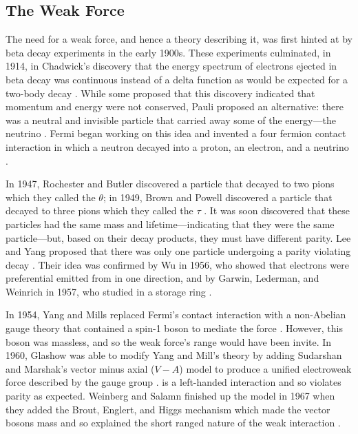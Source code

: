 \subsection{The Weak Force}
\label{subsection:weak_force}

The need for a weak force, and hence a theory describing it, was first hinted
at by beta decay experiments in the early 1900s. These experiments culminated,
in 1914, in Chadwick's discovery that the energy spectrum of electrons ejected
in beta decay was continuous instead of a delta function as would be expected
for a two-body decay \cite{chadwick1914}. While some proposed that this
discovery indicated that momentum and energy were not conserved, Pauli proposed
an alternative: there was a neutral and invisible particle that carried away
some of the energy---the neutrino \cite{pauli1930}. Fermi began working on this
idea and invented a four fermion contact interaction in which a neutron decayed
into a proton, an electron, and a neutrino \cite{fermi1934}.

In 1947, Rochester and Butler discovered a particle that decayed to two pions
which they called the $\theta$; in 1949, Brown and Powell discovered a particle
that decayed to three pions which they called the $\tau$
\cite{Rochester1947}\cite{brown1949}. It was soon discovered that these
particles had the same mass and lifetime---indicating that they were the same
particle---but, based on their decay products, they must have different parity.
Lee and Yang proposed that there was only one particle undergoing a parity
violating decay \cite{lee1956}. Their idea was confirmed by Wu in 1956, who
showed that electrons were preferential emitted from \cobaltsixty in one
direction, and by Garwin, Lederman, and Weinrich in 1957, who studied \pitomunu
in a storage ring \cite{wu1956}\cite{garwin1957}.

In 1954, Yang and Mills replaced Fermi's contact interaction with a non-Abelian
gauge theory that contained a spin-1 boson to mediate the force
\cite{yang1954}. However, this boson was massless, and so the weak force's
range would have been invite. In 1960, Glashow was able to modify Yang and
Mill's theory by adding Sudarshan and Marshak's vector minus axial ($V-A$)
model to produce a unified electroweak force described by the \SUtwoUone gauge
group \cite{glashow1961}\cite{sudarshan1958}. \SUtwo is a left-handed
interaction and so violates parity as expected. Weinberg and Salamn finished up
the model in 1967 when they added the Brout, Englert, and Higgs mechanism which
made the vector bosons mass and so explained the short ranged nature of the
weak interaction
\cite{weinberg1967}\cite{salam1968}\cite{englert1964}\cite{higgs1964}.

